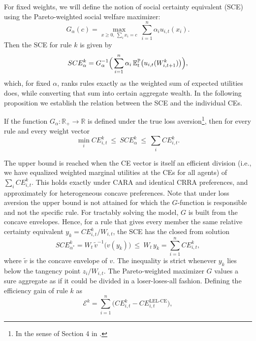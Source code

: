 For fixed weights, we will define the notion of social certainty equivalent (SCE) using the Pareto-weighted social welfare maximizer:
\begin{equation}
    G_{\alpha}(c)=\max_{x\ge0,\ \sum_ix_i=c}\ \sum_{i=1}^n\alpha_i u_{i,t}(x_i).
\end{equation}
Then the SCE for rule $k$ is given by
\begin{equation}
    SCE^k_{\alpha}=G_{\alpha}^{-1}\Big(\sum_{i=1}^n\alpha_i\,\mathbb{E}^{\mathbb{P}}_t\big(u_{i,t}(W^k_{i,t+1})\big)\Big),
\end{equation}
which, for fixed $\alpha$, ranks rules exactly as the weighted sum of expected utilities does, while converting that sum into certain aggregate wealth. In the following proposition we establish the relation between the SCE and the individual CEs.
\begin{proposition}
\label{Prop:SCE_relation}
    If the function $G_{\alpha}: \mathbb{R}_+ \to \mathbb{R}$ is defined under the true loss aversion\footnote{In the sense of Section 4 in \citet{Hlebarov_2026_MSc_Thesis}.}, then for every rule and every weight vector
    \begin{equation*}
        \min_iCE^k_{i,t}\ \le\ SCE^k_\alpha\ \le\ \sum_iCE^k_{i,t}.
    \end{equation*}
\end{proposition}
The upper bound is reached when the CE vector is itself an efficient division (i.e., we have equalized weighted marginal utilities at the CEs for all agents) of $\sum_i CE_{i,t}^k$. This holds exactly under CARA \citep{Wilson1968} and identical CRRA preferences, and approximately for heterogeneous concave preferences. Note that under loss aversion the upper bound is not attained for which the $G$-function is responsible and not the specific rule. For tractably solving the model, $G$ is built from the concave envelopes. Hence, for a rule that gives every member the same relative certainty equivalent $y_k = CE_{i,t}^k/W_{i,t}$, the SCE has the closed from solution
\begin{equation}
    \label{eq:SCE_gap}
    SCE^k_{\alpha^*}=W_t\,\tilde v^{-1}\big(v(y_k)\big)\ \le\ W_t\,y_k=\sum_{i=1}^n CE^k_{i,t},
\end{equation}
where $\tilde{v}$ is the concave envelope of $v$. The inequality is strict whenever $y_k$ lies below the tangency point $z_i/W_{i,t}$. The Pareto-weighted maximizer $G$ values a sure aggregate as if it could be divided in a loser-loses-all fashion. Defining the efficiency gain of rule $k$ as
\begin{equation*}
    \mathcal{E}^k=\sum_{i=1}^n\big(CE^k_{i,t}-CE^{\text{LEL-CE}}_{i,t}\big),
\end{equation*}
